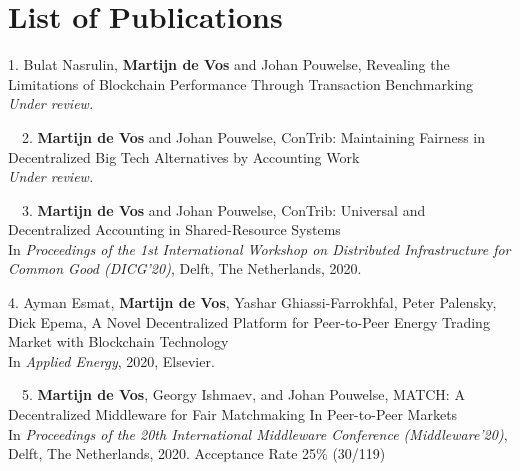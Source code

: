 \chapter*{List of Publications}
\label{publications}

\begin{etaremune}{%
\item[1.] Bulat Nasrulin, \textbf{Martijn de Vos} and Johan Pouwelse, Revealing the Limitations of Blockchain Performance Through Transaction Benchmarking\\
\emph{Under review.}


\item[\faFileTextO~~2.] \textbf{Martijn de Vos} and Johan Pouwelse, ConTrib: Maintaining Fairness in Decentralized Big Tech Alternatives by Accounting Work\\
\emph{Under review.}

\item[\faFileTextO~~3.] \textbf{Martijn de Vos} and Johan Pouwelse, ConTrib: Universal and Decentralized Accounting in Shared-Resource Systems\\
In \emph{Proceedings of the 1st International Workshop on Distributed Infrastructure for Common Good (DICG'20)}, Delft, The Netherlands, 2020.

\item[4.] Ayman Esmat, \textbf{Martijn de Vos}, Yashar Ghiassi-Farrokhfal, Peter Palensky, Dick Epema, A Novel Decentralized Platform for Peer-to-Peer Energy Trading Market with Blockchain Technology\\
In \emph{Applied Energy}, 2020, Elsevier.

\item[\faFileTextO~~5.] \textbf{Martijn de Vos}, Georgy Ishmaev, and Johan Pouwelse, MATCH: A Decentralized Middleware for Fair Matchmaking In
Peer-to-Peer Markets\\
In \emph{Proceedings of the 20th International Middleware Conference (Middleware'20)}, Delft, The Netherlands, 2020. Acceptance Rate 25\% (30/119)

}
\end{etaremune}
